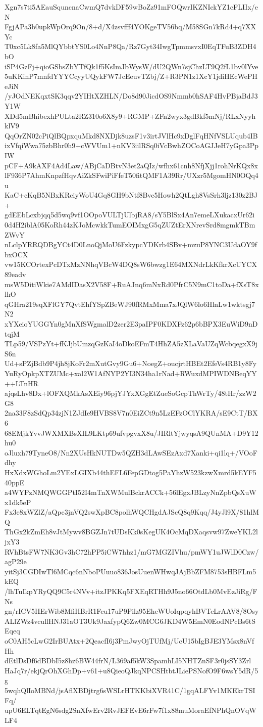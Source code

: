 Xgn7s7ti5AEauSquncnaCwmQ7dvkDF59wBoZz91mFOQwrIKZNIckYZ1cFLIIx/eN
FgjAPa3b0upkWpOrq9On/8+d/X4zsvfff4YOKgeTV56bq/M58SGn7kRd4+q7XXYc
T0xc5Lk8fa5MlQYbbtYS0Lo4NnP8Qa/Rz7Gyt34IwgTpmmsvxI0EqTFuB3ZDH4bO
iSP4GzFj+qioGSbsZbYTfQk1f5KsImJbWysW/dU2QWn7sjChzLT9Q2fL1bv0lYve
5uKKinP7mnfdYYYCcyyUQykFW7JcEeuvTZbj/Z+R3PN1z1XcY1jdiHEcWePHeJiN
/yJOdNEKqxtSK3qqv2YIHtXZHLN/Do8d90JicdOS9Nmmb0hSAF4HvPBjaBdJ3Y1W
XDd5mBhibexhPULta2RZ310o6X8y9+RGMP+ZFn2wyx3gdBkf5mNj/RLxNyyhklV9
QqOrZN02cPiQlBQpxquMkd8NXDjk8uzsF1v3irtJVlHc9xDglFqHNfVSLUqub4IB
ixVfqiWwa75zbBhr0h9+cWVUm1+nKV3iilRSq0iVcBwhZOCoAGJJeH7yGpa3PpIW
pCF+A9kAXF4Ad4Law/ABjCaDBtvN3et2aQIz/wfhx61cnh8NfjXjj1rohNrKQx8x
lF936P7AhmKnpzfHqvAiZkSFwiPiFfeT50fitQMF1A39Rr/UXzr5MgomHN0OQq4u
KaC+cKqB5NBxKRciyWoU4Gq8GH9bNtf8Bvc5Howh2QtLgh8VsSrh3ljz130z2BJ+
gdEEbLcxbjqq5d5wq9vf1OOpoVULTjUlbjRA8/sY5BlSx4An7emeLXukacxUr62i
0d4H2iblA05KoRh44zKJoMcwkkTumEOIMxgG5qZUZtErXNrevSrd8mgmkTBmZWvY
nLclpYRRQDBgYCt4D0LnoQjMoU6FzkypcYDKrb4SBv+mzuP8YNC3UdaOY9fbxOCX
vw15KCOrtexPcDTxMzNNhqVBcW4DQ8sW6bwzg1E64MXNdrLkKfkrXcUYCX89eadv
msW5DitiWkie7AMdIDasX2V58F+RuAJnq6mNxRd0PfrC5N9mC1toDa+fXsT8xlhO
qGHra219sqXFlGY7QvtEhfYSpZBeWJ90fRMxMma7xJQlW6lo6HlnLw1wktsgj7N2
xYXeioYUGGYn0gMnXfSWgmalD2zer2E3paIPF0KDXFz62p6bBPX3EuWiD9nDtqjM
TLp59/VSPzYt+fKJjbUmzqGzKaI4oDkoEFmT4HhZA5zXLaVaUZqWcbqegxX9jS6n
Ud+sPZjBdb9P4jh8jKoFr2mXutGvy9Gu6+NoegZ+oucjrtHBEt2EfeVs4RB1y8Fy
YuRyOpkpXTZUMc+xal2W1AfNYP2YI3N34ha1rNad+RWuxdMPIWDNBeqYY++LTnHR
ajqsLhv8Dx+lOFXQMkAsXEiy96pjYJYxXGgEtZueSoGcpThWrTy/48tHr/zzW2G8
2na33F8zSdQp34zjN1ZJdIe9HVBS8V7n0EiZCt9n5LzEFzOClYKRA/sE9CtT/BX6
68EMjkYvvJWXMXBsXIL9LKtp69ufvpgvxX8u/JIRltYjwyqsA9QUnMA+D9Y12hu0
oJluxh79TyneO8/Nn2XUsHkNUTDw5QZH3dLAwSEzAxd7Xanki+qi1lq+/VOoFdhy
HxXdxWGhoLm2YExLGIXb44thEFL6FepGDtog5PaYhzW523kzwXmrd5kEYF540ppE
a4WYPzNMQWGGPtI52I4mTnXWMulBckrACCk+56lEgxJBLzyNnZpbQsXuWx1dk5eP
Fx3e8xWZlZ/aQpc3jnVQ2swXpBC8polhWQCHgdAJScQ8q9Kqq/J4yJl9X/81hlMQ
ThGx2kZmEh8vJtMywv8BGZJn7tUDsKk0sKegUK4OcMqDXaqsvw97ZweYKL2ljxY3
RVhBtsFW7NK3Gv3hC72hPP5iCW7hhz1/mG7MGZIVhu/pmWY1uJWlD0Czw/agP29e
yitSj3CGDIwTl6MCqc6nNboPUuuo836JosUuenWHwqJAjBbZFM8753sHBFLm5kEQ
/lhTuIkpYRyQQ9C5r4NVv+itzJPKKq5FXEqRTHh9J5no66OtdLb0MvEzJiRg/FNs
gn/rICV5HErWib8MfiHBrR1Fcu17uP9Pilz95EheWUoIqpqyhBVTeLrAAV8/8Osy
ALlZWz4vcullHNJ31aOT3Uk9JaxfypQ6Zw0MCG6JKD4W5EmN0EodNPcBs6tSEqeq
oC0AH5cLwG2IrBUAtx+2QeacfI6j3PmJwyOjTUfMj/UcU15bIgBJE3YMsx8nVfHh
dEtlDsDf6dBDbI5z8hz6BW44frN/L369af5kW3SpamhLI5NHTZnSF3r0jsSY3Zrl
HaJq7r/ekjQrOhXGhDp+v61+u8QieoQJkqNPCSHtbtJLiePSNofO9F6wsY5dR/5g
5wqhQlIoMBNd/jsAflXBDjtrg6sWSLrHTKKbiXVR41C/1gqALFYv1MKEkrTSIFq/
upU6ELTqtEgN6sdg2SnXfwErv2RvJEFEvE6rFw7f1x88muMoraEfNPhQnOVqWLF4
